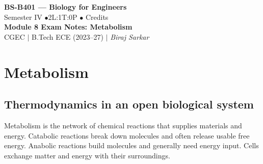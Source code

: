 \documentclass[12pt,a4paper]{article}
\begin{document}
\begin{center}
  {\LARGE\bfseries\color{myred} BS-B401 --- Biology for Engineers}\\[5pt]
  {\normalsize\color{mydark} Semester IV \quad$\bullet$\quad 2L:1T:0P \quad$\bullet$ Credits}\\[3pt]
  {\normalsize\color{myteal}\textbf{Module 8 Exam Notes: Metabolism}}\\[3pt]
  {\small\color{mydark} CGEC \;$|$\; B.Tech ECE (2023--27) \;$|$\; \textit{Biraj Sarkar}}
\end{center}
\vspace{2pt}
\noindent{\color{myred}\rule{\linewidth}{1.5pt}}
\vspace{2pt}

\hypersetup{linkcolor=mydark}
\tableofcontents
\hypersetup{linkcolor=myteal}
\newpage

\section{Metabolism}
\subsection{Thermodynamics in an open biological system}
\begin{tcolorbox}[defbox, title={Metabolism}]
Metabolism is the network of chemical reactions that supplies materials and energy. Catabolic reactions break down molecules and often release usable free energy. Anabolic reactions build molecules and generally need energy input. Cells exchange matter and energy with their surroundings.
\end{tcolorbox}
\end{document}
